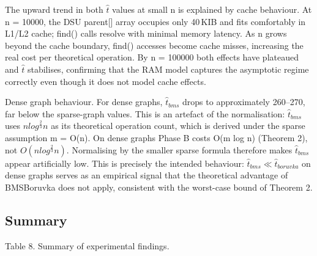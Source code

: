 \documentclass[11pt]{article}
\theoremstyle{plain}
\theoremstyle{remark}
\begin{document}
The upward trend in both \(\widehat{t}\) values at small n is explained
by cache behaviour. At n = 10000, the DSU parent{[}{]} array occupies
only 40\,KIB and fits comfortably in L1/L2 cache; find() calls resolve
with minimal memory latency. As n grows beyond the cache boundary,
find() accesses become cache misses, increasing the real cost per
theoretical operation. By n = 100000 both effects have plateaued and
\(\widehat{t}\) stabilises, confirming that the RAM model captures the
asymptotic regime correctly even though it does not model cache effects.

Dense graph behaviour. For dense graphs, \({\widehat{t}}_{bms}\) drops
to approximately 260--270, far below the sparse-graph values. This is an
artefact of the normalisation: \({\widehat{t}}_{bms}\) uses
\(nlog^{\frac{2}{3}}n\) as its theoretical operation count, which is
derived under the sparse assumption m = O(n). On dense graphs Phase B
costs O(m log n) (Theorem 2), not
\(O\left( nlog^{\frac{2}{3}}n \right)\). Normalising by the smaller
sparse formula therefore makes \({\widehat{t}}_{bms}\) appear
artificially low. This is precisely the intended behaviour:
\({\widehat{t}}_{bms} \ll {\widehat{t}}_{boruvka}\) on dense graphs
serves as an empirical signal that the theoretical advantage of
BMSBoruvka does not apply, consistent with the worst-case bound of
Theorem 2.

\subsection{Summary}

Table 8. Summary of experimental findings.
\end{document}
